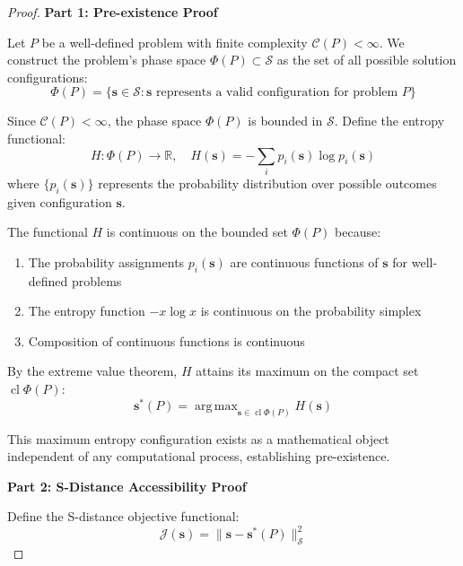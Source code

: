 \documentclass[11pt]{article}
\theoremstyle{definition}
\theoremstyle{remark}
\DeclareMathOperator{\argmax}{arg\,max}
\DeclareMathOperator{\closure}{cl}
\newcommand{\Real}{\mathbb{R}}
\newcommand{\SEntropy}{\mathcal{S}}
\begin{document}
\begin{proof}
\textbf{Part 1: Pre-existence Proof}

Let $P$ be a well-defined problem with finite complexity $\mathcal{C}(P) < \infty$. We construct the problem's phase space $\Phi(P) \subset \SEntropy$ as the set of all possible solution configurations:
\begin{equation}
\Phi(P) = \{\mathbf{s} \in \SEntropy : \mathbf{s} \text{ represents a valid configuration for problem } P\}
\end{equation}

Since $\mathcal{C}(P) < \infty$, the phase space $\Phi(P)$ is bounded in $\SEntropy$. Define the entropy functional:
\begin{equation}
H: \Phi(P) \to \Real, \quad H(\mathbf{s}) = -\sum_{i} p_i(\mathbf{s}) \log p_i(\mathbf{s})
\end{equation}
where $\{p_i(\mathbf{s})\}$ represents the probability distribution over possible outcomes given configuration $\mathbf{s}$.

The functional $H$ is continuous on the bounded set $\Phi(P)$ because:
\begin{enumerate}
\item The probability assignments $p_i(\mathbf{s})$ are continuous functions of $\mathbf{s}$ for well-defined problems
\item The entropy function $-x \log x$ is continuous on the probability simplex
\item Composition of continuous functions is continuous
\end{enumerate}

By the extreme value theorem, $H$ attains its maximum on the compact set $\closure{\Phi(P)}$:
\begin{equation}
\mathbf{s}^*(P) = \argmax_{\mathbf{s} \in \closure{\Phi(P)}} H(\mathbf{s})
\end{equation}

This maximum entropy configuration exists as a mathematical object independent of any computational process, establishing pre-existence.

\textbf{Part 2: S-Distance Accessibility Proof}

Define the S-distance objective functional:
\begin{equation}
\mathcal{J}(\mathbf{s}) = \|\mathbf{s} - \mathbf{s}^*(P)\|_{\SEntropy}^2
\end{equation}


\end{proof}
\end{document}
